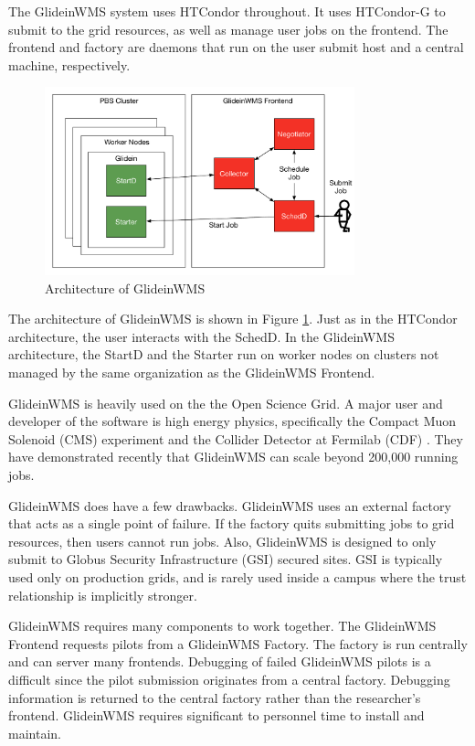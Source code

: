 The GlideinWMS system uses HTCondor throughout.  It uses HTCondor-G \cite{frey2002condor} to submit to the grid resources, as well as manage user jobs on the frontend.  The frontend and factory are daemons that run on the user submit host and a central machine, respectively.

\begin{figure}[h!t]
	\centering
	\includegraphics[width=0.8\textwidth]{images/GlideinArch.pdf}
	\caption{Architecture of GlideinWMS}
	\label{fig:glideinarch}
	
\end{figure}  

The architecture of GlideinWMS is shown in Figure \ref{fig:glideinarch}.  Just as in the HTCondor architecture, the user interacts with the SchedD.  In the GlideinWMS architecture, the StartD and the Starter run on worker nodes on clusters not managed by the same organization as the GlideinWMS Frontend.
 
 
GlideinWMS is heavily used on the the Open Science Grid.  A major user and developer of the software is high energy physics, specifically the Compact Muon Solenoid (CMS) experiment \cite{bradley2010use} and the Collider Detector at Fermilab (CDF) \cite{zvada2010cdf}.  They have demonstrated recently that GlideinWMS can scale beyond 200,000 running jobs.
 
GlideinWMS does have a few drawbacks.  GlideinWMS uses an external factory that acts as a single point of failure.  If the factory quits submitting jobs to grid resources, then users cannot run jobs.  Also, GlideinWMS is designed to only submit to Globus Security Infrastructure (GSI) secured sites.  GSI is typically used only on production grids, and is rarely used inside a campus where the trust relationship is implicitly stronger.  

GlideinWMS requires many components to work together.  The GlideinWMS Frontend requests pilots from a GlideinWMS Factory.  The factory is run centrally and can server many frontends.  Debugging of failed GlideinWMS pilots is a difficult since the pilot submission originates from a central factory.  Debugging information is returned to the central factory rather than the researcher's frontend.  GlideinWMS requires significant to personnel time to install and maintain.


